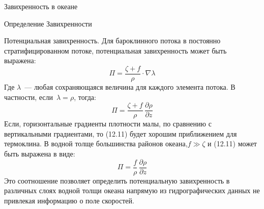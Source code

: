\begin{chapter}{Завихренность в океане}
\begin{section}{Определение Завихренности}
\begin{paragraph}{Потенциальная завихренность.}
Для бароклинного потока в постоянно стратифицированном потоке,
потенциальная завихренность может быть выражена:
\begin{equation}
 \Pi = \frac{\zeta + f}{\rho} \cdot \nabla \lambda
\end{equation}
Где $\lambda$~--- любая сохраняющаяся величина для каждого элемента
потока. В частности, если~$\lambda = \rho$, тогда:
\begin{equation}
 \Pi = \frac{\zeta + f}{\rho}\,\frac{\partial{\rho}}{\partial{z}}
\end{equation}
Если, горизонтальные градиенты плотности малы, по сравнению с
вертикальными градиентами, то (12.11) будет хорошим приближением для
термоклина. В водной толще большинства районов океана,$f \gg \zeta$ 
и (12.11) может быть выражена в виде:
\begin{equation}
 \Pi = \frac{f}{\rho}\,\frac{\partial{\rho}}{\partial{z}}
\end{equation}
Это соотношение позволяет определить потенциальную завихренность в
различных слоях водной толщи океана напрямую из гидрографических
данных не привлекая информацию о поле скоростей.
%
\end{paragraph}
\end{section}


\end{chapter}
